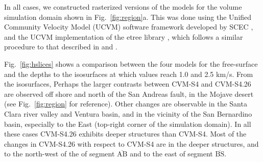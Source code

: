 In all cases, we constructed rasterized versions of the models for the volume simulation domain shown in Fig.~\ref{fig:region}a. This was done using the Unified Community Velocity Model (UCVM) software framework developed by SCEC \citep{Small_2011_AGU, Gill_2015_SSA}, and the UCVM implementation of the etree library \citep{Tu_2003_Tech}, which follows a similar procedure to that described in \citet{Taborda_2007_Proc} and \citet{Schlosser_2008_Proc}.

Fig.~\ref{fig:hslices} shows a comparison between the four models for the free-surface \vs{} and the depths to the isosurfaces at which \vs{} values reach 1.0 and 2.5 km/s. From the isosurfaces, Perhaps the larger contrasts between CVM-S4 and CVM-S4.26 are observed off shore and north of the San Andreas fault, in the Mojave desert (see Fig.~\ref{fig:region} for reference). Other changes are observable in the Santa Clara river valley and Ventura basin, and in the vicinity of the San Bernardino basin, especially to the East (top-right corner of the simulation domain). In all these cases CVM-S4.26 exhibits deeper structures than CVM-S4. Most of the changes in CVM-S4.26 with respect to CVM-S4 are in the deeper structures, and to the north-west of the of segment $\overline{\mathrm{AB}}$ and to the east of segment $\overline{\mathrm{BS}}$.
